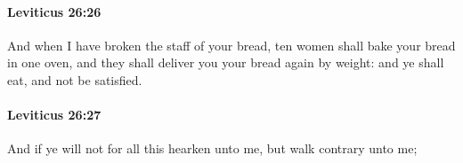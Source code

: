 		\paragraph{Leviticus 26:26} %
			\label{LEVITICUS-26-26}

			And when I have broken the staff of your bread, ten women shall bake your bread in one oven, and they shall deliver you your bread again by weight: and ye shall eat, and not be satisfied.


		\paragraph{Leviticus 26:27} %
			\label{LEVITICUS-26-27}

			And if ye will not for all this hearken unto me, but walk contrary unto me;


